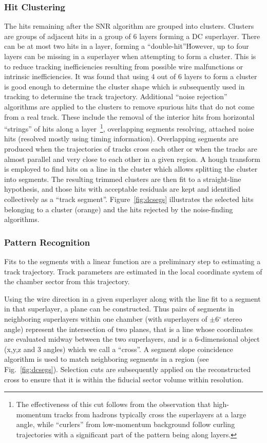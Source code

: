 \documentclass[3p,times,twocolumn]{elsarticle}
\begin{document}
\subsubsection{Hit Clustering}
The hits remaining after the SNR
algorithm are grouped into clusters.
Clusters are groups of adjacent hits in a group of 6 layers forming a DC superlayer.  There can be at most
two hits in a layer, forming a ``double-hit''\.  However, up to four layers can be missing in a superlayer
when attempting to form a cluster.  This is to reduce tracking inefficiencies resulting from possible wire malfunctions or
intrinsic inefficiencies. It was found that using 4 out of 6 layers to form a cluster is good enough
to determine the cluster shape which is subsequently used in tracking to determine the track trajectory.
Additional ``noise rejection'' algorithms are applied to the clusters to remove spurious hits
that do not come from a real track. These include the removal of the
interior hits from horizontal ``strings'' of hits along a layer~\footnote{The effectiveness of this cut follows
from the observation that high-momentum tracks from hadrons typically cross the superlayers at a large angle,
while ``curlers'' from low-momentum background follow curling trajectories with a significant part of the
pattern being along layers.}, overlapping segments resolving, attached noise hits (resolved mostly using timing
information). Overlapping segments are produced when the trajectories of tracks cross each other
or when the tracks are almost parallel and very close to each other in a given region.
A hough transform is employed to find hits on a line in the cluster which allows splitting the cluster into
segments.  The resulting trimmed clusters are then fit to a straight-line hypothesis, and those hits with
acceptable residuals are kept and identified collectively as a ``track segment''.
Figure~\ref{fig:dcsegs} illustrates the selected hits belonging to a cluster (orange) and the hits
rejected by the noise-finding algorithms.

\subsubsection{Pattern Recognition}
Fits to the segments with a linear function are a preliminary step to estimating
a track trajectory. Track parameters are estimated in the local coordinate system of the chamber sector from
this trajectory.

Using the wire direction in a given superlayer along with the line fit to a segment in that superlayer, a plane can be constructed.
Thus pairs of segments in
neighboring superlayers within one chamber (with superlayers of $\pm$6$^\circ$ stereo angle) represent the
intersection of two planes, that is a line whose coordinates are evaluated midway between the two
superlayers, and is a 6-dimensional object (x,y,z and 3 angles) which we call a ``cross''.
A segment slope coincidence algorithm is used to match neighboring segments in a region (see
Fig.~\ref{fig:dcsegs}).  Selection cuts are subsequently applied on the
reconstructed cross to ensure that it is within the fiducial sector volume within resolution.
\end{document}
